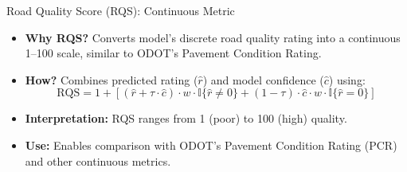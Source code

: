 \documentclass{beamer}
\begin{document}
\begin{frame}[label=rqs]{Road Quality Score (RQS): Continuous Metric}
    \begin{itemize}
        \item \textbf{Why RQS?} Converts model's discrete road quality rating into a continuous 1--100 scale, similar to ODOT's Pavement Condition Rating.
        \item \textbf{How?} Combines predicted rating ($\hat{r}$) and model confidence ($\hat{c}$) using:
        \begin{equation*}
            \text{RQS} = 1 + [
            (\hat{r} + \tau \cdot \hat{c}) \cdot w \cdot \mathbb{I}\{\hat{r} \ne 0\}
            + (1 - \tau) \cdot \hat{c} \cdot w  \cdot \mathbb{I}\{\hat{r} = 0\} ]
        \end{equation*}
        \item \textbf{Interpretation:} RQS ranges from 1 (poor) to 100 (high) quality.
        \item \textbf{Use:} Enables comparison with ODOT's Pavement Condition Rating (PCR) and other continuous metrics.
    \end{itemize}
    \begin{flushright}
        \hyperlink{road_quality_measures}{}
    \end{flushright}
\end{frame}
\end{document}
